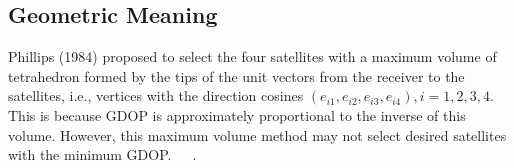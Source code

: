 \documentclass[a4paper]{report}
\begin{document}
\subsection{Geometric Meaning}
Phillips (1984) proposed to select the four satellites with a
maximum volume of tetrahedron formed by the tips of the
unit vectors from the receiver to the satellites, i.e., vertices
with the direction cosines $(e_{i1}, e_{i2}, e_{i3}, e_{i4}), i = 1, 2, 3, 4$. This
is because GDOP is approximately proportional to the inverse of this volume. However, this maximum volume method may not select desired satellites with the minimum GDOP.~\cite{simon1995navigation}~\cite{doong2009closed}~\cite{teng2016closed}.

 

\end{document}
